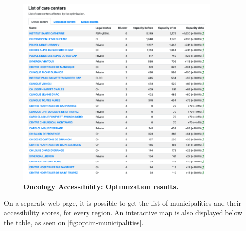\begin{figure}[H]
    \includegraphics[width=0.9\textwidth]{images/oncology-accessibility/optim-paca-grown-hospitals.png}
    \centering
    \caption{
        \textbf{Oncology Accessibility: Optimization results.}
    }
    \label{fig:optim-grown-hospitals}
\end{figure}

On a separate web page, it is possible to get the list of municipalities and their accessibility scores, for every region. An interactive map is also displayed below the table, as seen on \cref{fig:optim-municipalities}.

